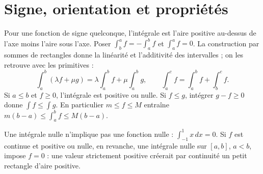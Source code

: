 \documentclass[../cours_tle.tex]{subfiles}
\begin{document}
\section{Signe, orientation et propriétés}
Pour une fonction de signe quelconque, l'intégrale est l'aire positive au-dessus de l'axe moins l'aire sous l'axe. Poser $\int_b^a f=-\int_a^b f$ et $\int_a^a f=0$.
La construction par sommes de rectangles donne la linéarité et l'additivité des intervalles ; on les retrouve avec les primitives :
\[
\int_a^b(\lambda f+\mu g)=\lambda\int_a^bf+\mu\int_a^bg,\qquad
\int_a^cf=\int_a^bf+\int_b^cf.
\]
Si $a\le b$ et $f\ge0$, l'intégrale est positive ou nulle. Si $f\le g$, intégrer $g-f\ge0$ donne $\int f\le\int g$.
En particulier $m\le f\le M$ entraîne $m(b-a)\le\int_a^bf\le M(b-a)$.
\begin{attention}
Une intégrale nulle n'implique pas une fonction nulle : $\int_{-1}^1 x\,dx=0$.
Si $f$ est continue et positive ou nulle, en revanche, une intégrale nulle sur $[a,b]$, $a<b$, impose $f=0$ : une valeur strictement positive créerait par continuité un petit rectangle d'aire positive.
\end{attention}
\end{document}
